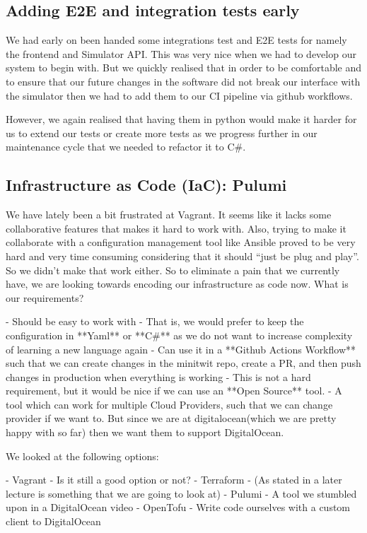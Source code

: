 \subsection{Adding E2E and integration tests early}

We had early on been handed some integrations test and E2E tests for namely the frontend and Simulator API. This was very nice when we had to develop our system to begin with. But we quickly realised that in order to be comfortable and to ensure that our future changes in the software did not break our interface with the simulator then we had to add them to our CI pipeline via github workflows.

However, we again realised that having them in python would make it harder for us to extend our tests or create more tests as we progress further in our maintenance cycle that we needed to refactor it to C#.

\subsection{Infrastructure as Code (IaC): Pulumi}

We have lately been a bit frustrated at Vagrant. It seems like it lacks some collaborative features that makes it hard to work with. Also, trying to make it collaborate with a configuration management tool like Ansible proved to be very hard and very time consuming considering that it should “just be plug and play”. So we didn’t make that work either. So to eliminate a pain that we currently have, we are looking towards encoding our infrastructure as code now. What is our requirements?

- Should be easy to work with
    - That is, we would prefer to keep the configuration in **Yaml** or **C#** as we do not want to increase complexity of learning a new language again
- Can use it in a **Github Actions Workflow** such that we can create changes in the minitwit repo, create a PR, and then push changes in production when everything is working
- This is not a hard requirement, but it would be nice if we can use an **Open Source** tool.
- A tool which can work for multiple Cloud Providers, such that we can change provider if we want to. But since we are at digitalocean(which we are pretty happy with so far) then we want them to support DigitalOcean.

We looked at the following options:

- Vagrant - Is it still a good option or not?
- Terraform - (As stated in a later lecture is something that we are going to look at)
- Pulumi - A tool we stumbled upon in a DigitalOcean video
- OpenTofu
- Write code ourselves with a custom client to DigitalOcean

